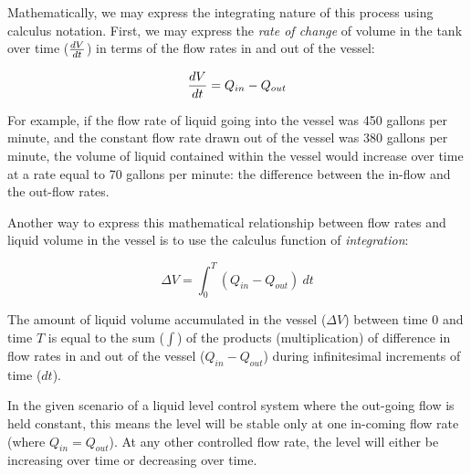 Mathematically, we may express the integrating nature of this process using calculus notation.  First, we may express the \textit{rate of change} of volume in the tank over time ($dV \over dt$) in terms of the flow rates in and out of the vessel:

$${dV \over dt} = Q_{in} - Q_{out}$$

For example, if the flow rate of liquid going into the vessel was 450 gallons per minute, and the constant flow rate drawn out of the vessel was 380 gallons per minute, the volume of liquid contained within the vessel would increase over time at a rate equal to 70 gallons per minute: the difference between the in-flow and the out-flow rates.

Another way to express this mathematical relationship between flow rates and liquid volume in the vessel is to use the calculus function of \textit{integration}:

$$\Delta V = \int_0^T (Q_{in} - Q_{out}) \> dt$$

The amount of liquid volume accumulated in the vessel ($\Delta V$) between time 0 and time $T$ is equal to the sum ($\int$) of the products (multiplication) of difference in flow rates in and out of the vessel ($Q_{in} - Q_{out}$) during infinitesimal increments of time ($dt$).

In the given scenario of a liquid level control system where the out-going flow is held constant, this means the level will be stable only at one in-coming flow rate (where $Q_{in} = Q_{out}$).  At any other controlled flow rate, the level will either be increasing over time or decreasing over time.

